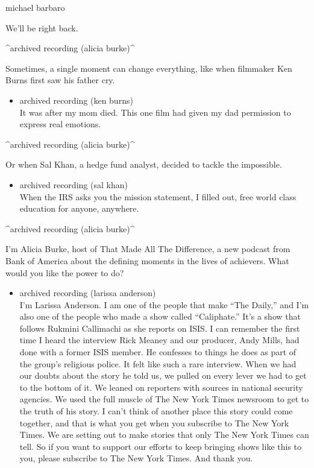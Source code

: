 michael barbaro

We'll be right back.

\^{}archived recording (alicia burke)\^{}

Sometimes, a single moment can change everything, like when filmmaker
Ken Burns first saw his father cry.

\begin{itemize}
\tightlist
\item
  archived recording (ken burns)\\
  It was after my mom died. This one film had given my dad permission to
  express real emotions.
\end{itemize}

\^{}archived recording (alicia burke)\^{}

Or when Sal Khan, a hedge fund analyst, decided to tackle the
impossible.

\begin{itemize}
\tightlist
\item
  archived recording (sal khan)\\
  When the IRS asks you the mission statement, I filled out, free world
  class education for anyone, anywhere.
\end{itemize}

\^{}archived recording (alicia burke)\^{}

I'm Alicia Burke, host of That Made All The Difference, a new podcast
from Bank of America about the defining moments in the lives of
achievers. What would you like the power to do?

\begin{itemize}
\tightlist
\item
  archived recording (larissa anderson)\\
  I'm Larissa Anderson. I am one of the people that make ``The Daily,''
  and I'm also one of the people who made a show called ``Caliphate.''
  It's a show that follows Rukmini Callimachi as she reports on ISIS. I
  can remember the first time I heard the interview Rick Meaney and our
  producer, Andy Mills, had done with a former ISIS member. He confesses
  to things he does as part of the group's religious police. It felt
  like such a rare interview. When we had our doubts about the story he
  told us, we pulled on every lever we had to get to the bottom of it.
  We leaned on reporters with sources in national security agencies. We
  used the full muscle of The New York Times newsroom to get to the
  truth of his story. I can't think of another place this story could
  come together, and that is what you get when you subscribe to The New
  York Times. We are setting out to make stories that only The New York
  Times can tell. So if you want to support our efforts to keep bringing
  shows like this to you, please subscribe to The New York Times. And
  thank you.
\end{itemize}

